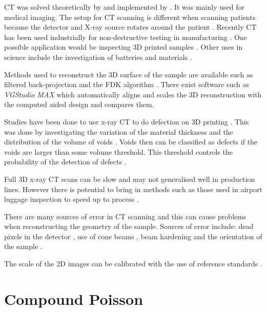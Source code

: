 \documentclass[12pt, a4paper]{memoir}
\begin{document}
CT was solved theoretically by \cite{cormack1973reconstruction} and implemented  by \cite{hounsfield1973computerized} \citep{hounsfield1980computed}. It was mainly used for medical imaging. The setup for CT scanning is different when scanning patients because the detector and X-ray source rotates around the patient \citep{cantatore2011introduction}. Recently CT has been used industrially for non-destructive testing in manufacturing \citep{cantatore2011introduction}. One possible application would be inspecting 3D printed samples \citep{villarraga2015assessing}. Other uses in science include the investigation of batteries \citep{o2017investigating} and materials \citep{wang2017x} \citep{zhang2016x}.

Methods used to reconstruct the 3D surface of the sample are available such as filtered back-projection \citep{brooks1976principles} and the FDK algorithm \citep{feldkamp1984practical}. There exist software such as \emph{VGStudio MAX} \citep{reinhart2008industrial} which automatically aligns and scales the 3D reconstruction with the computed aided design and compares them.

Studies have been done to use x-ray CT to do defection on 3D printing \citep{kim2016inspection} \citep{villarraga2015assessing}. This was done by investigating the variation of the material thickness and the distribution of the volume of voids \citep{villarraga2015assessing}. Voids then can be classified as defects if the voids are larger than some volume threshold. This threshold controls the probability of the detection of defects \citep{amrhein2014characterization} \citep{gandossi2010probability}.

Full 3D x-ray CT scans can be slow and may not generalised well in production lines. However there is potential to bring in methods such as those used in airport luggage inspection to speed up to process \citep{warnett2016towards}.

There are many sources of error in CT scanning \citep{cantatore2011introduction} and this can cause problems when reconstructing the geometry of the sample. Sources of error include: dead pixels in the detector \citep{brettschneider2014spatial}, use of cone beams \citep{sun2016applications}, beam hardening and the orientation of the sample \citep{corcoran2016observations}.

The scale of the 2D images can be calibrated with the use of reference standards \citep{bartscher2007enhancement} \citep{lifton2013application}.

\section{Compound Poisson}
\end{document}
